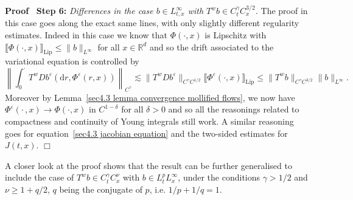 \documentclass[10pt]{article}
\newcommand{\mathd}{\mathrm{d}}
\newcommand{\tmop}[1]{\ensuremath{\operatorname{#1}}}
\newcommand{\tmstrong}[1]{\textbf{#1}}
\newcommand{\tmtextit}[1]{{\itshape{#1}}}
\newenvironment{proof}{\noindent\textbf{Proof\ }}{\hspace*{\fill}$\Box$\medskip}
\begin{document}
\begin{proof}
  {\tmstrong{Step 6:}} \tmtextit{Differences in the case $b \in L^{\infty}_{t,
  x}$ with $T^w b \in C^{\gamma}_t C^{3 / 2}_x$.} The proof in this case goes
  along the exact same lines, with only slightly different regularity
  estimates. Indeed in this case we know that $\Phi (\cdot, x)$ is Lipschitz
  with $\llbracket \Phi (\cdot, x) \rrbracket_{\tmop{Lip}} \leqslant \| b
  \|_{L^{\infty}}$ for all $x \in \mathbb{R}^d$ and so the drift associated to
  the variational equation is controlled by
  \[ \left\| \int_0^{\cdot} T^w D b^{\varepsilon} (\mathd r,
     \Phi^{\varepsilon} (r, x)) \right\|_{C^{\gamma}} \lesssim \| T^w D
     b^{\varepsilon} \|_{C^{\gamma} C^{1 / 2}}  \llbracket \Phi^{\varepsilon}
     (\cdot, x) \rrbracket_{\tmop{Lip}} \leqslant \| T^w b \|_{C^{\gamma} C^{3
     / 2}}  \| b \|_{L^{\infty}} . \]
  Moreover by Lemma~\ref{sec4.3 lemma convergence mollified flows}, we now
  have $\Phi^{\varepsilon} \left( \cdot \,, x \right) \rightarrow \Phi (\cdot,
  x)$ in $C^{1 - \delta}$ for all $\delta > 0$ and so all the reasonings
  related to compactness and continuity of Young integrals still work. A
  similar reasoning goes for equation~{\eqref{sec4.3 jacobian equation}} and
  the two-sided estimates for $J (t, x)$.
\end{proof}

\begin{remark}
  A closer look at the proof shows that the result can be further generalised
  to include the case of $T^w b \in C^{\gamma}_t C^{\nu}_x$ with $b \in L^p_t
  L^{\infty}_x$, under the conditions $\gamma > 1 / 2$ and $\nu \geqslant 1 +
  q / 2$, $q$ being the conjugate of $p$, i.e. $1 / p + 1 / q = 1$.
\end{remark}
\end{document}
